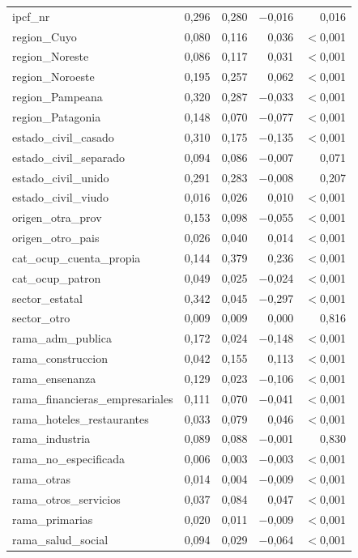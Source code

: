 \begin{longtable}{lrrrr}
ipcf\_nr & 0,296 & 0,280 & $-$0,016 & 0,016 \\
region\_Cuyo & 0,080 & 0,116 & 0,036 & $<$0,001 \\
region\_Noreste & 0,086 & 0,117 & 0,031 & $<$0,001 \\
region\_Noroeste & 0,195 & 0,257 & 0,062 & $<$0,001 \\
region\_Pampeana & 0,320 & 0,287 & $-$0,033 & $<$0,001 \\
region\_Patagonia & 0,148 & 0,070 & $-$0,077 & $<$0,001 \\
estado\_civil\_casado & 0,310 & 0,175 & $-$0,135 & $<$0,001 \\
estado\_civil\_separado & 0,094 & 0,086 & $-$0,007 & 0,071 \\
estado\_civil\_unido & 0,291 & 0,283 & $-$0,008 & 0,207 \\
estado\_civil\_viudo & 0,016 & 0,026 & 0,010 & $<$0,001 \\
origen\_otra\_prov & 0,153 & 0,098 & $-$0,055 & $<$0,001 \\
origen\_otro\_pais & 0,026 & 0,040 & 0,014 & $<$0,001 \\
cat\_ocup\_cuenta\_propia & 0,144 & 0,379 & 0,236 & $<$0,001 \\
cat\_ocup\_patron & 0,049 & 0,025 & $-$0,024 & $<$0,001 \\
sector\_estatal & 0,342 & 0,045 & $-$0,297 & $<$0,001 \\
sector\_otro & 0,009 & 0,009 & 0,000 & 0,816 \\
rama\_adm\_publica & 0,172 & 0,024 & $-$0,148 & $<$0,001 \\
rama\_construccion & 0,042 & 0,155 & 0,113 & $<$0,001 \\
rama\_ensenanza & 0,129 & 0,023 & $-$0,106 & $<$0,001 \\
rama\_financieras\_empresariales & 0,111 & 0,070 & $-$0,041 & $<$0,001 \\
rama\_hoteles\_restaurantes & 0,033 & 0,079 & 0,046 & $<$0,001 \\
rama\_industria & 0,089 & 0,088 & $-$0,001 & 0,830 \\
rama\_no\_especificada & 0,006 & 0,003 & $-$0,003 & $<$0,001 \\
rama\_otras & 0,014 & 0,004 & $-$0,009 & $<$0,001 \\
rama\_otros\_servicios & 0,037 & 0,084 & 0,047 & $<$0,001 \\
rama\_primarias & 0,020 & 0,011 & $-$0,009 & $<$0,001 \\
rama\_salud\_social & 0,094 & 0,029 & $-$0,064 & $<$0,001 \\

\end{longtable}
